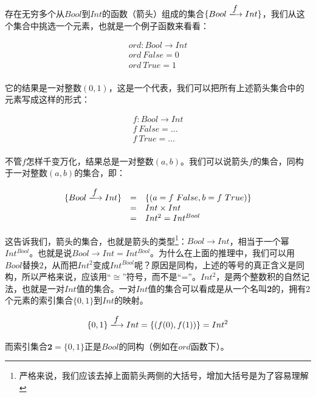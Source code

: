 \documentclass[b5paper]{ctexart}
\begin{document}
\begin{example}
存在无穷多个从$Bool$到$Int$的函数（箭头）组成的集合$\{Bool \arrowto{f} Int\}$，我们从这个集合中挑选一个元素，也就是一个例子函数来看看：

\[
\begin{array}{l}
ord : Bool \to Int \\
ord\ False = 0 \\
ord\ True = 1 \\
\end{array}
\]

它的结果是一对整数$(0, 1)$，这是一个代表，我们可以把所有上述箭头集合中的元素写成这样的形式：

\[
\begin{array}{l}
f : Bool \to Int \\
f\ False = ... \\
f\ True = ... \\
\end{array}
\]

不管$f$怎样千变万化，结果总是一对整数$(a, b)$。我们可以说箭头$f$的集合，同构于一对整数$(a, b)$的集合，即：

\[
\begin{array}{rcl}
\{Bool \arrowto{f} Int\} & = & \{(a = f\ False, b = f\ True)\} \\
  & = & Int \times Int \\
  & = & Int^2 = Int^{Bool}
\end{array}
\]

这告诉我们，箭头的集合，也就是箭头的类型\footnote{严格来说，我们应该去掉上面箭头两侧的大括号，增加大括号是为了容易理解}：$Bool \to Int$，相当于一个幂$Int^{Bool}$。也就是说$Bool \to Int = Int^{Bool}$。为什么在上面的推理中，我们可以用$Bool$替换$2$，从而把$Int^2$变成$Int^{Bool}$呢？原因是同构，上述的等号的真正含义是同构，所以严格来说，应该用“$\cong$”符号，而不是“=”。$Int^2$，是两个整数积的自然记法，也就是一对$Int$值的集合。一对$Int$值的集合可以看成是从一个名叫\textbf{2}的，拥有2个元素的索引集合$\{0, 1\}$到$Int$的映射。

\[
\{0, 1\} \arrowto{f} Int = \{(f(0), f(1))\} = Int^2
\]

而索引集合$\mathbf{2} = \{0, 1\}$正是$Bool$的同构（例如在$ord$函数下）。
\end{example}
\end{document}
